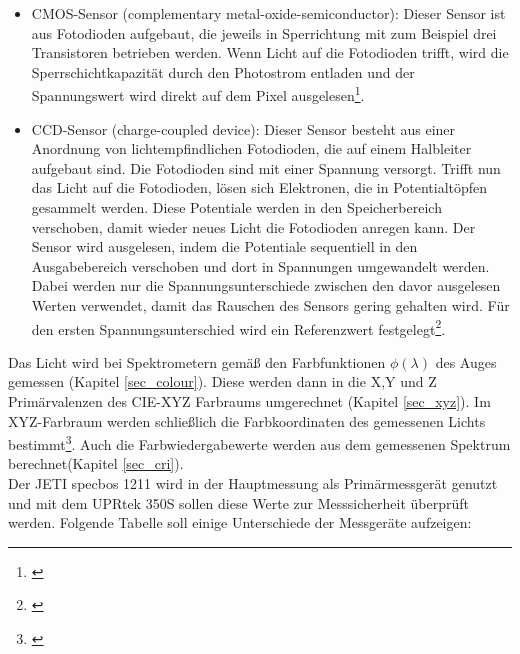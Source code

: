 \begin{itemize}
\item CMOS-Sensor (complementary metal-oxide-semiconductor): Dieser Sensor ist aus Fotodioden aufgebaut, die jeweils in Sperrichtung mit zum Beispiel drei Transistoren betrieben werden. Wenn Licht auf die Fotodioden trifft, wird die Sperrschichtkapazität durch den Photostrom entladen und der Spannungswert wird direkt auf dem Pixel ausgelesen\footnote{\cite[369]{schmidt}}.

\newpage
\item CCD-Sensor (charge-coupled device): Dieser Sensor besteht aus einer Anordnung von lichtempfindlichen Fotodioden, die auf einem Halbleiter aufgebaut sind. Die Fotodioden sind mit einer Spannung versorgt. Trifft nun das Licht auf die Fotodioden, lösen sich Elektronen, die in Potentialtöpfen gesammelt werden. Diese Potentiale werden in den Speicherbereich verschoben, damit wieder neues Licht die Fotodioden anregen kann. Der Sensor wird ausgelesen, indem die Potentiale sequentiell in den Ausgabebereich verschoben und dort in Spannungen umgewandelt werden. Dabei werden nur die Spannungsunterschiede zwischen den davor ausgelesen Werten verwendet, damit das Rauschen des Sensors gering gehalten wird. Für den ersten Spannungsunterschied wird ein Referenzwert festgelegt\footnote{\cite[17]{jeti}}.

\end{itemize}

\noindent Das Licht wird bei Spektrometern gemäß den Farbfunktionen $\phi(\lambda)$ des Auges gemessen (Kapitel \ref{sec_colour}). Diese werden dann in die X,Y und Z Primärvalenzen des CIE-XYZ Farbraums umgerechnet (Kapitel \ref{sec_xyz}). Im XYZ-Farbraum werden schließlich die Farbkoordinaten des gemessenen Lichts bestimmt\footnote{\cite[30]{jeti}}. Auch die Farbwiedergabewerte werden aus dem gemessenen Spektrum berechnet(Kapitel \ref{sec_cri}).\\

\noindent Der JETI specbos 1211 wird in der Hauptmessung als Primärmessgerät genutzt und mit dem UPRtek 350S sollen diese Werte zur Messsicherheit überprüft werden. Folgende Tabelle soll einige Unterschiede der Messgeräte aufzeigen:

